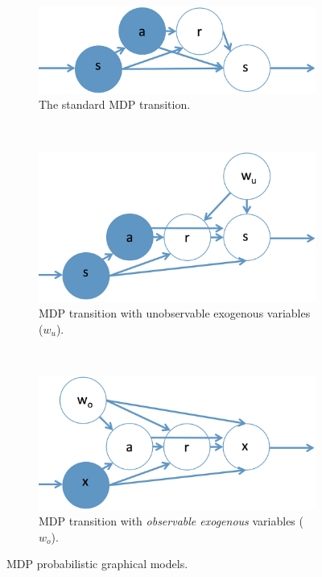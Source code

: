 \documentclass{article}
\begin{document}
\begin{figure}
    \centering
    \begin{subfigure}[t]{0.30\textwidth}
        \includegraphics[width=\textwidth]{png/mdp1ras.png}
        \caption{The standard MDP transition.}
        \label{fig:MDP1}
    \end{subfigure}
    ~~~
    \begin{subfigure}[t]{0.30\textwidth}
        \includegraphics[width=\textwidth]{png/mdp2ras.png}
        \caption{
        MDP transition with unobservable exogenous variables ($w_u$).
        }
        \label{fig:MDP2}
    \end{subfigure}
    ~~~
    \begin{subfigure}[t]{0.30\textwidth}
        \includegraphics[width=\textwidth]{png/mdp3ras.png}
        \caption{
        MDP transition with \emph{observable exogenous} variables ($w_o$).}
        \label{fig:MDP3}
    \end{subfigure}
    \caption{MDP probabilistic graphical models.}
    \label{fig:PGMMDP}
\end{figure}
\end{document}
